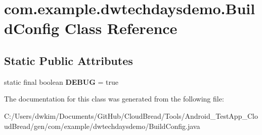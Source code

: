 \hypertarget{a00021}{}\section{com.\+example.\+dwtechdaysdemo.\+Build\+Config Class Reference}
\label{a00021}
\subsection*{Static Public Attributes}
\begin{DoxyCompactItemize}
\item 
static final boolean {\bfseries D\+E\+B\+UG} = true\hypertarget{a00021_a50181a140684170980ee09094097c661}{}\label{a00021_a50181a140684170980ee09094097c661}

\end{DoxyCompactItemize}


The documentation for this class was generated from the following file\+:\begin{DoxyCompactItemize}
\item 
C\+:/\+Users/dwkim/\+Documents/\+Git\+Hub/\+Cloud\+Bread/\+Tools/\+Android\+\_\+\+Test\+App\+\_\+\+Cloud\+Bread/gen/com/example/dwtechdaysdemo/Build\+Config.\+java\end{DoxyCompactItemize}
